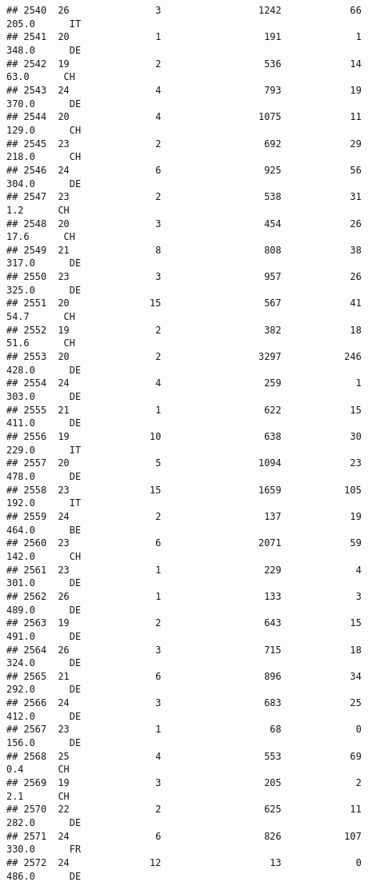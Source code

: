 \documentclass[
]{article}
\begin{document}
\begin{verbatim}
## 2540  26               3                 1242            66    205.0      IT
## 2541  20               1                  191             1    348.0      DE
## 2542  19               2                  536            14     63.0      CH
## 2543  24               4                  793            19    370.0      DE
## 2544  20               4                 1075            11    129.0      CH
## 2545  23               2                  692            29    218.0      CH
## 2546  24               6                  925            56    304.0      DE
## 2547  23               2                  538            31      1.2      CH
## 2548  20               3                  454            26     17.6      CH
## 2549  21               8                  808            38    317.0      DE
## 2550  23               3                  957            26    325.0      DE
## 2551  20              15                  567            41     54.7      CH
## 2552  19               2                  382            18     51.6      CH
## 2553  20               2                 3297           246    428.0      DE
## 2554  24               4                  259             1    303.0      DE
## 2555  21               1                  622            15    411.0      DE
## 2556  19              10                  638            30    229.0      IT
## 2557  20               5                 1094            23    478.0      DE
## 2558  23              15                 1659           105    192.0      IT
## 2559  24               2                  137            19    464.0      BE
## 2560  23               6                 2071            59    142.0      CH
## 2561  23               1                  229             4    301.0      DE
## 2562  26               1                  133             3    489.0      DE
## 2563  19               2                  643            15    491.0      DE
## 2564  26               3                  715            18    324.0      DE
## 2565  21               6                  896            34    292.0      DE
## 2566  24               3                  683            25    412.0      DE
## 2567  23               1                   68             0    156.0      DE
## 2568  25               4                  553            69      0.4      CH
## 2569  19               3                  205             2      2.1      CH
## 2570  22               2                  625            11    282.0      DE
## 2571  24               6                  826           107    330.0      FR
## 2572  24              12                   13             0    486.0      DE

\end{verbatim}
\end{document}

